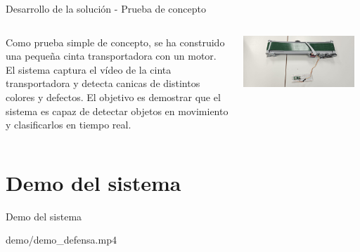 \documentclass[spanish]{beamer}
\begin{document}
\begin{frame}{Desarrollo de la solución - Prueba de concepto}
    \begin{columns}
        \begin{column}{0.5\textwidth}
            Como prueba simple de concepto, se ha construido una pequeña cinta transportadora con un motor. El sistema captura el vídeo de la cinta transportadora y detecta canicas de distintos colores y defectos. El objetivo es demostrar que el sistema es capaz de detectar objetos en movimiento y clasificarlos en tiempo real.


        \end{column}
        \begin{column}{0.5\textwidth}
            \includegraphics[width=0.95\textwidth]{images/solucion_propuesta/cinta_transportadora_construccion.jpeg}
        \end{column}
    \end{columns}
\end{frame}

\section{Demo del sistema}
\begin{frame}{Demo del sistema}
    \begin{center}
        {demo/demo_defensa.mp4}
    \end{center}
\end{frame}
\end{document}
